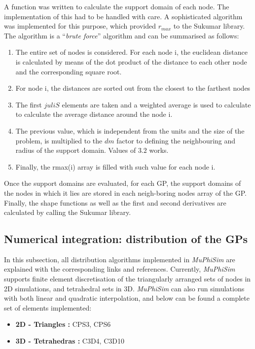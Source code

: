 \documentclass[oneside,11pt,times]{book}
\begin{document}
A function was written to calculate the support domain of each node. The implementation of this had to be handled with care. A sophisticated algorithm was implemented for this purpose, which provided $r_{max}$ to the Sukumar library. The algorithm is a ``\textit{brute force}'' algorithm and can be summarised as follows:
\begin{enumerate}
\item The entire set of nodes is considered. For each node i, the euclidean distance is calculated by means of the dot product of the distance to each other node and the corresponding square root.
\item For node i, the distances are sorted out from the closest to the farthest nodes
\item The first $juliS$ elements are taken and a weighted average is used to calculate to calculate the average distance around the node i.
\item The previous value, which is independent from the units and the size of the problem, is multiplied to the $dm$ factor to defining the neighbouring and radius of the support domain. Values of $3.2$ works.
\item Finally, the rmax(i) array is filled with such value for each node i.
\end{enumerate}

Once the support domains are evaluated, for each GP, the support domains of the nodes in which it lies are stored in each neigh-boring nodes array of the GP. Finally, the shape functions as well as the first and second derivatives are calculated by calling the Sukumar library.

\subsection[Distribution of GPs]{Numerical integration: distribution of the GPs}\label{sub:GPs2DTriangles}
In this subsection, all distribution algorithms implemented in \textit{MuPhiSim} are explained with the corresponding links and references. Currently, \textit{MuPhiSim} supports finite element discretisation of the triangularly arranged sets of nodes in 2D simulations, and tetrahedral sets in 3D. \textit{MuPhiSim} can also run simulations with both linear and quadratic interpolation, and below can be found a complete set of elements implemented:
\begin{itemize}
    \item \textbf{2D - Triangles :} CPS3, CPS6
    \item \textbf{3D - Tetrahedras :} C3D4, C3D10
\end{itemize}
\end{document}
